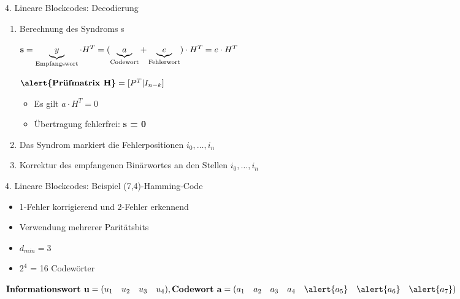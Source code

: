 \documentclass[ngerman]{beamer}
\begin{document}
\begin{frame}{4. Lineare Blockcodes: Decodierung}
\begin{enumerate}


	\item Berechnung des Syndroms s\newline

	$\textbf{s} = \underbrace{y}_\text{Empfangswort} \cdot H^{T} = (\underbrace{a}_\text{Codewort} + \underbrace{e}_\text{Fehlerwort}) \cdot H^{T} = e \cdot H^{T}\newline$

	$
	\textbf{\alert{Prüfmatrix H}} = [P^{T} | I_{n-k}]
	$
	\begin{itemize}
		\item Es gilt $a\cdot H^{T} = 0$
		\item Übertragung fehlerfrei: \textbf{s = 0}
	\end{itemize}



	\item Das Syndrom markiert die Fehlerpositionen $ i_{0},\dots, i_{n}$
	\item Korrektur des empfangenen Binärwortes an den Stellen $ i_{0},\dots, i_{n} $
\end{enumerate}

\end{frame}


\begin{frame}{4. Lineare Blockcodes: Beispiel (7,4)-Hamming-Code}
	\begin{itemize}
		\item 1-Fehler korrigierend und 2-Fehler erkennend
		\item Verwendung mehrerer \alert{Paritätsbits}
		\item $d_{min} = 3$
		\item $ 2^{4}$ = 16 Codewörter

	\end{itemize}
\begin{math}
 	\textbf{Informationswort u} = \begin{matrix} (u_{1} & u_{2} & u_{3} & u_{4})\end{matrix},\newline
 \textbf{Codewort a} = \begin{matrix} ( a_{1} & a_{2} & a_{3} & a_{4}  & \alert{a_{5}} & \alert{a_{6}} & \alert{a_{7}} ) \end{matrix}
 \end{math}

\end{frame}
\end{document}
